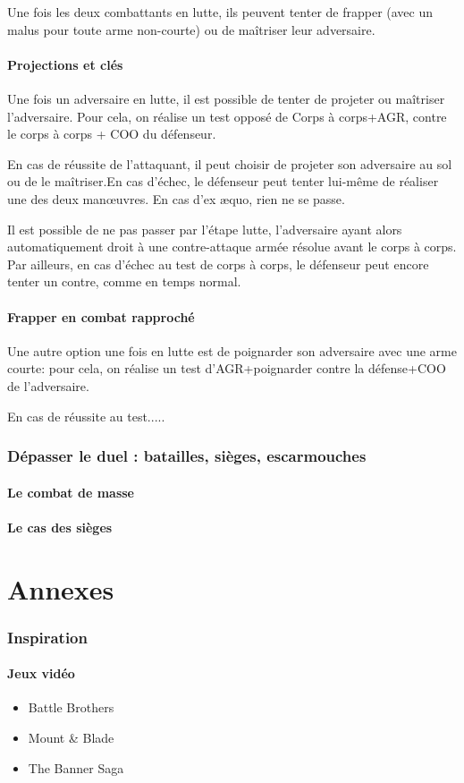 \documentclass[10pt,a4paper,twocolumn]{book}
\begin{document}
Une fois les deux combattants en lutte, ils peuvent tenter de frapper (avec un malus pour toute arme non-courte) ou de maîtriser leur adversaire.
\subsection{Projections et clés}
Une fois un adversaire en lutte, il est possible de tenter de projeter ou maîtriser l'adversaire. Pour cela, on réalise un test opposé de Corps à corps+AGR, contre le corps à corps + COO du défenseur.

En cas de réussite de l'attaquant, il peut choisir de projeter son adversaire au sol ou de le maîtriser.En cas d'échec, le défenseur peut tenter lui-même de réaliser une des deux manœuvres. En cas d'ex æquo, rien ne se passe.

Il est possible de ne pas passer par l'étape lutte, l'adversaire ayant alors automatiquement droit à une contre-attaque armée résolue avant le corps à corps. Par ailleurs, en cas d'échec au test de corps à corps, le défenseur peut encore tenter un contre, comme en temps normal.
\subsection{Frapper en combat rapproché}
Une autre option une fois en lutte est de poignarder son adversaire avec une arme courte: pour cela, on réalise un test d'AGR+poignarder contre la défense+COO de l'adversaire.

En cas de réussite au test.....
\section{Dépasser le duel : batailles, sièges, escarmouches}
\subsection{Le combat de masse}
\subsection{Le cas des sièges}


\part*{Annexes}
\section*{Inspiration}
\subsection*{Jeux vidéo}
\begin{itemize}
\item Battle Brothers
\item Mount \& Blade
\item The Banner Saga
\end{itemize}
\end{document}
